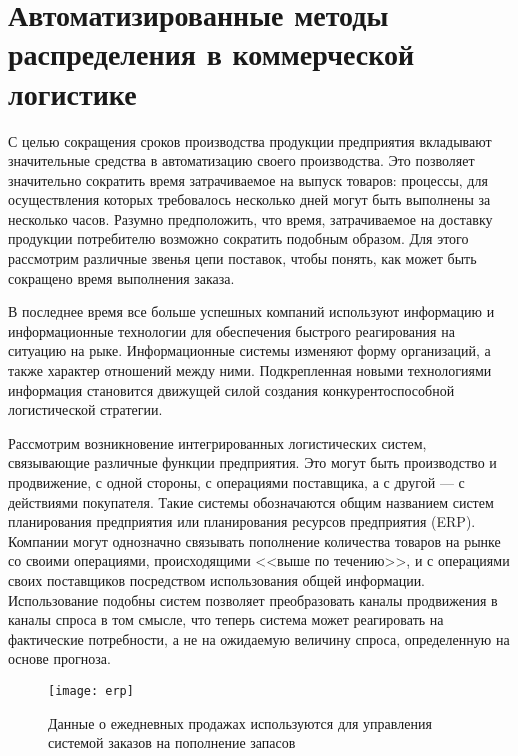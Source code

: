 \section{Автоматизированные методы распределения в коммерческой логистике}

С целью сокращения сроков производства продукции предприятия вкладывают значительные средства в автоматизацию своего производства.
Это позволяет значительно сократить время затрачиваемое на выпуск товаров: процессы, для осуществления которых требовалось несколько дней могут быть выполнены за несколько часов.
Разумно предположить, что время, затрачиваемое на доставку продукции потребителю возможно сократить подобным образом.
Для этого рассмотрим различные звенья цепи поставок, чтобы понять, как может быть сокращено время выполнения заказа.


В последнее время все больше успешных  компаний используют информацию и информационные технологии для обеспечения быстрого реагирования на ситуацию на рыке.
Информационные системы изменяют форму организаций, а также характер отношений между ними.
Подкрепленная новыми технологиями информация становится движущей силой создания конкурентоспособной логистической стратегии.

Рассмотрим возникновение интегрированных логистических систем, связывающие различные функции предприятия.
Это могут быть производство и продвижение, с одной стороны, с операциями поставщика, а с другой --- с действиями покупателя.
Такие системы обозначаются общим названием систем планирования предприятия или планирования ресурсов предприятия (ERP).
Компании могут однозначно связывать пополнение количества товаров на рынке со своими операциями, происходящими <<выше по течению>>, и с операциями своих поставщиков посредством использования общей информации.
Использование подобны систем позволяет преобразовать каналы продвижения в каналы спроса в том смысле, что теперь система может реагировать на фактические потребности, а не на ожидаемую величину спроса, определенную на основе прогноза.

\begin{figure}[h]
	\centering
	\texttt{[image: erp]}
	\caption{Данные о ежедневных продажах используются для управления системой заказов на пополнение запасов}
	\label{fig:erp}
\end{figure}

